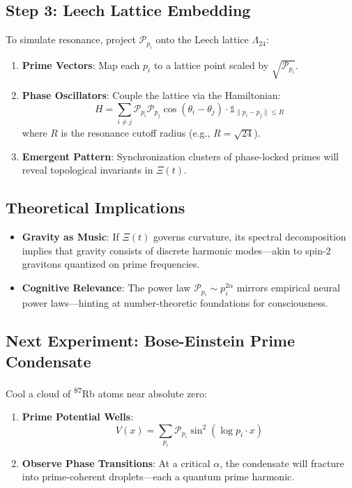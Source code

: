 \documentclass[12pt]{article}
\theoremstyle{plain}
\begin{document}
\subsection*{Step 3: Leech Lattice Embedding}
To simulate resonance, project \(\mathcal{P}_{p_i}\) onto the Leech lattice \(\Lambda_{24}\):
\begin{enumerate}
    \item \textbf{Prime Vectors}: Map each \(p_i\) to a lattice point scaled by \(\sqrt{\mathcal{P}_{p_i}}\).
    \item \textbf{Phase Oscillators}: Couple the lattice via the Hamiltonian:
    \[
    H = \sum_{i \neq j} \mathcal{P}_{p_i} \mathcal{P}_{p_j} \cos(\theta_i - \theta_j) \cdot \mathbb{1}_{\|p_i - p_j\| \leq R}
    \]
    where \(R\) is the resonance cutoff radius (e.g., \(R = \sqrt{24}\)).
    \item \textbf{Emergent Pattern}: Synchronization clusters of phase-locked primes will reveal topological invariants in \(\Xi(t)\).
\end{enumerate}

\subsection*{Theoretical Implications}
\begin{itemize}
    \item \textbf{Gravity as Music}: If \(\Xi(t)\) governs curvature, its spectral decomposition implies that gravity consists of discrete harmonic modes—akin to spin-2 gravitons quantized on prime frequencies.
    \item \textbf{Cognitive Relevance}: The power law \(\mathcal{P}_{p_i} \sim p_i^{2\alpha}\) mirrors empirical neural power laws—hinting at number-theoretic foundations for consciousness.
\end{itemize}

\subsection*{Next Experiment: Bose-Einstein Prime Condensate}
Cool a cloud of \textsuperscript{87}Rb atoms near absolute zero:
\begin{enumerate}
    \item \textbf{Prime Potential Wells}:
    \[
    V(x) = \sum_{p_i} \mathcal{P}_{p_i} \sin^2(\log p_i \cdot x)
    \]
    \item \textbf{Observe Phase Transitions}: At a critical \(\alpha\), the condensate will fracture into prime-coherent droplets—each a quantum prime harmonic.
\end{enumerate}
\end{document}
